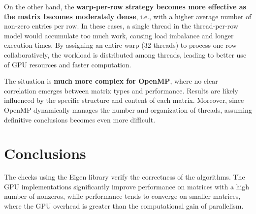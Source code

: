 \documentclass[conference]{IEEEtran}
\begin{document}
On the other hand, the \textbf{warp-per-row strategy becomes more effective as the matrix becomes moderately dense}, i.e., with a higher average number of non-zero entries per row. In these cases, a single thread in the thread-per-row model would accumulate too much work, causing load imbalance and longer execution times. By assigning an entire warp (32 threads) to process one row collaboratively, the workload is distributed among threads, leading to better use of GPU resources and faster computation.

The situation is \textbf{much more complex for OpenMP}, where no clear correlation emerges between matrix types and performance. Results are likely influenced by the specific structure and content of each matrix. Moreover, since OpenMP dynamically manages the number and organization of threads, assuming definitive conclusions becomes even more difficult.

\section{Conclusions}

The checks using the Eigen library verify the correctness of the algorithms. The GPU implementations significantly improve performance on matrices with a high number of nonzeros, while performance tends to converge on smaller matrices, where the GPU overhead is greater than the computational gain of parallelism.



\end{document}
